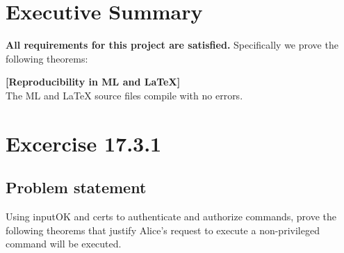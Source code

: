 \documentclass{report}
\begin{document}
\chapter{Executive Summary}
\label{cha:executive-summary}

\textbf{All requirements for this project are satisfied.}
Specifically we prove the following theorems:
\begin{quote}
\HOLSMZeroSolutionsTheoremsAliceXXnprivXXlemma
{}\HOLSMZeroSolutionsTheoremsAliceXXexecXXnprivXXjustifiedXXthm
{}\HOLSMZeroSolutionsTheoremsAliceXXnprivXXverifiedXXthm
{}\HOLSMZeroSolutionsTheoremsAliceXXjustifiedXXnprivXXexecXXthm
{}\HOLSMZeroSolutionsTheoremsCarolXXnprivXXlemma
{}\HOLSMZeroSolutionsTheoremsCarolXXexecXXnprivXXjustifiedXXthm
{}\HOLSMZeroSolutionsTheoremsCarolXXnprivXXverifiedXXthm
{}\HOLSMZeroSolutionsTheoremsCarolXXjustifiedXXnprivXXexecXXthm
{}\HOLSMZeroSolutionsTheoremsCarolXXprivcmdXXtrapXXlemma
{}\HOLSMZeroSolutionsTheoremsCarolXXjustifiedXXprivcmdXXtrapXXthm
{}\HOLSMZeroSolutionsTheoremsCarolXXprivcmdXXtrappedXXthm
{}\HOLSMZeroSolutionsTheoremsCarolXXtrapXXprivcmdXXjustifiedXXthm
{}\HOLSMZeroSolutionsTheoremsinputOKTwoXXdef
{}\HOLSMZeroSolutionsDefinitionscertsTwoXXdef
\end{quote}

\textbf{[Reproducibility in ML and \LaTeX{}]} \ \\
  The ML and \LaTeX{} source files compile with no errors.


\chapter{Excercise 17.3.1}
\label{cha:17.3.1}

\section{Problem statement}
\label{problem-statement-1}
Using inputOK and certs to authenticate and authorize commands, prove the following
theorems that justify Alice’s request to execute a non-privileged command will be executed.
\end{document}
